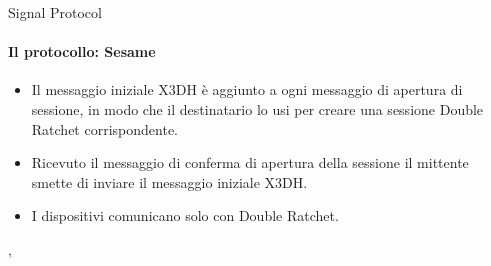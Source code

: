 \begin{frame}{Signal Protocol}
    \framesubtitle{Il protocollo: Sesame}
    \begin{itemize}        
        \item Il messaggio iniziale X3DH è aggiunto a ogni messaggio di apertura di sessione, in modo che il destinatario lo usi per creare una sessione Double Ratchet corrispondente.\pause
        \item Ricevuto il messaggio di conferma di apertura della sessione il mittente smette di inviare il messaggio iniziale X3DH. \pause
        \item I dispositivi comunicano solo con Double Ratchet.
    \end{itemize}

    \cite{sesame}, \cite{VanDam}
\end{frame}
